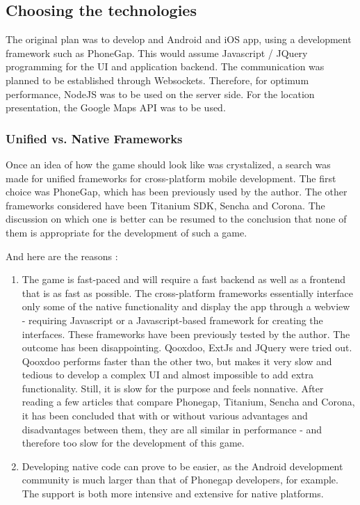 \documentclass{article}
\begin{document}
\subsection{Choosing the technologies}

The original plan was to develop and Android and iOS app, using a development
framework such as PhoneGap. This would assume Javascript / JQuery programming
for the UI and application backend. The communication was planned to be
established through Websockets. Therefore, for optimum performance, NodeJS was
to be used on the server side. For the location presentation, the Google Maps
API was to be used.

\subsubsection{Unified vs. Native Frameworks}

Once an idea of how the game should look like was crystalized, a search was
made for unified frameworks for cross-platform mobile development. The first
choice was PhoneGap, which has been previously used by the author. The other
frameworks considered have been Titanium SDK, Sencha and Corona. The discussion
on which one is better can be resumed to the conclusion that none of them is
appropriate for the development of such a game.\newline

And here are the reasons : 
\begin{enumerate}
  \item The game is fast-paced and will require a fast backend as well as a
  frontend that is as fast as possible. The cross-platform frameworks
  essentially interface only some of the native functionality and display the
  app through a webview - requiring Javascript or a Javascript-based framework
  for creating the interfaces. These frameworks have been previously tested by
  the author. The outcome has been disappointing. Qooxdoo, ExtJs and JQuery were
  tried out. Qooxdoo performs faster than the other two, but makes it very slow
  and tedious to develop a complex UI and almost impossible to add extra
  functionality. Still, it is slow for the purpose and feels nonnative. After
  reading a few articles that compare Phonegap, Titanium, Sencha and Corona, it
  has been concluded that with or without various advantages and disadvantages
  between them, they are all similar in performance - and therefore too slow for
  the development of this game.
  
  \item Developing native code can prove to be easier, as the Android
  development community is much larger than that of Phonegap developers, for
  example. The support is both more intensive and extensive for native
  platforms. 
  
\end{enumerate}
\end{document}
